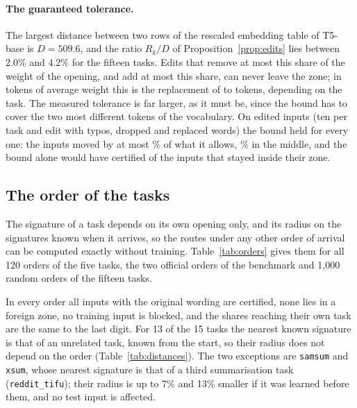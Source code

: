 \paragraph{The guaranteed tolerance.} The largest distance between two rows of the rescaled
embedding table of T5-base is $D = 509.6$, and the ratio $R_k / D$ of Proposition~\ref{prop:edits}
lies between 2.0\% and 4.2\% for the fifteen tasks. Edits that remove at most this share of the
weight of the opening, and add at most this share, can never leave the zone; in tokens of average weight this is the replacement of \BoundTokensLow{} to \BoundTokensHigh{} tokens,
depending on the task. The measured tolerance is far larger, as it must be, since the bound has to
cover the two most different tokens of the vocabulary. On \BoundInputs{} edited inputs (ten per task and edit with
typos, dropped and replaced words) the bound held for every one: the inputs moved by at most
\BoundWorstPct{}\% of what it allows, \BoundMedianPct{}\% in the middle, and the bound
alone would have certified \BoundGuaranteed{} of the \BoundInside{} inputs that stayed inside
their zone.

\subsection{The order of the tasks}
\label{sec:orders}

The signature of a task depends on its own opening only, and its radius on the signatures known
when it arrives, so the routes under any other order of arrival can be computed exactly without training. Table~\ref{tab:orders} gives them for all
120 orders of the five tasks, the two official orders of the benchmark and 1{,}000 random
orders of the fifteen tasks.

\begin{table}[t]
  \caption{The order of the tasks (routes only, T5-base word-vectors). Entries with four numbers are
  for the original / light / medium / heavy wording; the reworded inputs are those of the five tasks.
  ``Blocked'': training inputs inside an older zone. ``Changed'': test inputs whose route changed
  after their task had been added; a range depends on the order.}
  \label{tab:orders}
  \centering
  \footnotesize
  \setlength{\tabcolsep}{3.5pt}
  
\end{table}

In every order all inputs with the original wording are certified, none lies in a foreign
zone, no training input is blocked, and the shares reaching their own task are the
same to the last digit. For 13 of the 15 tasks the nearest known signature is
that of an unrelated task, known from the start, so their radius does not depend on the order (Table~\ref{tab:distances}). The two exceptions are \texttt{samsum} and \texttt{xsum}, whose nearest signature is that of a third summarisation task
(\texttt{reddit\_tifu}); their radius is up to 7\% and 13\% smaller if it was learned
before them, and no test input is affected.

